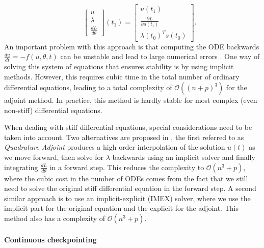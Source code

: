\begin{enumerate}[label=(\roman*)]
\begin{equation}
    \qquad 
    \begin{bmatrix}
       u \\
       \lambda \\
       \frac{dL}{d\theta}
    \end{bmatrix}(t_1)
    = 
    \begin{bmatrix}
       u(t_1) \\
       \frac{\partial L}{\partial u(t_1)} \\
       \lambda(t_0)^T s(t_0)
    \end{bmatrix}.
    \end{equation}
    An important problem with this approach is that computing the ODE backwards $\frac{du}{dt} = - f(u,\theta, t)$ can be unstable and lead to large numerical errors \cite{kim_stiff_2021, Zhuang_2020}. 
    One way of solving this system of equations that ensures stability is by using implicit methods. 
    However, this requires cubic time in the total number of ordinary differential equations, leading to a total complexity of $\mathcal O((n+p)^3)$ for the adjoint method. In practice, this method is hardly stable for most complex (even non-stiff) differential equations. 
\end{enumerate} 

When dealing with stiff differential equations, special considerations need to be taken into account.
Two alternatives are proposed in \cite{kim_stiff_2021}, the first referred to as \textit{Quadrature Adjoint} produces a high order interpolation of the solution $u(t)$ as we move forward, then solve for $\lambda$ backwards using an implicit solver and finally integrating $\frac{dL}{d\theta}$ in a forward step.
This reduces the complexity to $\mathcal O (n^3 + p)$, where the cubic cost in the number of ODEs comes from the fact that we still need to solve the original stiff differential equation in the forward step. 
A second similar approach is to use an implicit-explicit (IMEX) solver, where we use the implicit part for the original equation and the explicit for the adjoint. 
This method also has a complexity of $\mathcal O (n^3 + p)$.

\paragraph{Continuous checkpointing}

